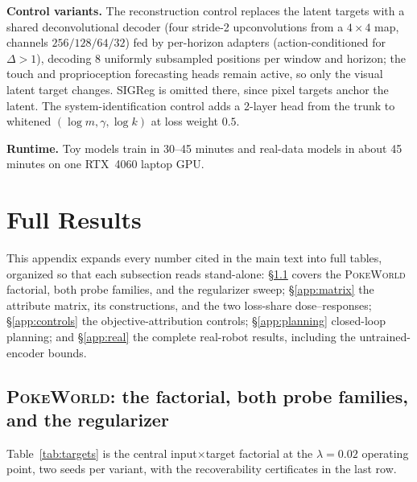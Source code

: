 \documentclass{article} %
\newcommand{\pokeworld}{\textsc{PokeWorld}}
\begin{document}
\textbf{Control variants.} The reconstruction control replaces the latent
targets with a shared deconvolutional decoder (four stride-2 upconvolutions
from a $4{\times}4$ map, channels $256/128/64/32$) fed by per-horizon
adapters (action-conditioned for $\Delta > 1$), decoding 8 uniformly
subsampled positions per window and horizon; the touch and proprioception
forecasting heads remain active, so only the visual latent target changes.
SIGReg is omitted there, since pixel targets anchor the latent. The system-identification control adds a
2-layer head from the trunk to whitened $(\log m, \gamma, \log k)$ at loss
weight $0.5$.

\textbf{Runtime.} Toy models train in 30--45 minutes and real-data models in
about 45 minutes on one RTX~4060 laptop GPU.

\section{Full Results}
\label{app:results}

This appendix expands every number cited in the main text into full tables,
organized so that each subsection reads stand-alone:
\S\ref{app:toy} covers the \pokeworld{} factorial, both probe families, and
the regularizer sweep; \S\ref{app:matrix} the attribute matrix, its
constructions, and the two loss-share dose--responses; \S\ref{app:controls}
the objective-attribution controls; \S\ref{app:planning} closed-loop
planning; and \S\ref{app:real} the complete real-robot results, including
the untrained-encoder bounds.

\subsection{\pokeworld{}: the factorial, both probe families, and the regularizer}
\label{app:toy}

Table~\ref{tab:targets} is the central input$\times$target factorial at the
$\lambda{=}0.02$ operating point, two seeds per variant, with the
recoverability certificates in the last row.
\end{document}
